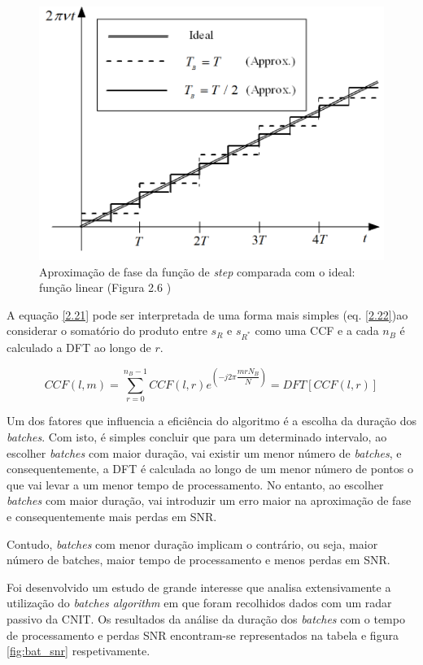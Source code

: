 \begin{figure}[h]
\centering
\includegraphics[scale=0.6]{chapters/ch2/assets/phase_ap}
\caption[Aproximação de fase]{Aproximação de fase da função de \textit{step} comparada com o ideal: função linear (Figura 2.6 \cite{Martorella})}
\label{fig:phase_ap}
\end{figure}

A equação \ref{2.21} pode ser interpretada de uma forma mais simples (eq. \ref{2.22})ao considerar o somatório do produto entre $s_{R}$ e $s_{R^{\ast}}$ como uma \gls{CCF} e a cada $n_{B}$ é calculado a \gls{DFT} ao longo de $r$.

\begin{equation} \label{2.22}
CCF\left( l,m\right)=\sum_{r=0}^{n_{B}-1}CCF\left( l,r\right) e^{\left( -j2\pi \dfrac{mrN_{B}}{N}\right)}=DFT\left[ CCF\left( l,r\right) \right] 
\end{equation}

Um dos fatores que influencia a eficiência do algoritmo é a escolha da duração dos \textit{batches}. Com isto, é simples concluir que para um determinado intervalo, ao escolher \textit{batches} com maior duração, vai existir um menor número de \textit{batches}, e consequentemente, a \gls{DFT} é calculada ao longo de um menor número de pontos o que vai levar a um menor tempo de processamento. No entanto, ao escolher \textit{batches} com maior duração, vai introduzir um erro maior na aproximação de fase e consequentemente mais perdas em \gls{SNR}.\par
Contudo, \textit{batches} com menor duração implicam o contrário, ou seja, maior número de batches, maior tempo de processamento e menos perdas em \gls{SNR}. \par 
Foi desenvolvido um estudo de grande interesse \parencite{Petri2012} que analisa extensivamente a utilização do \textit{batches algorithm} em que foram recolhidos dados com um radar passivo da \gls{CNIT}. Os resultados da análise da duração dos \textit{batches} com o tempo de processamento e perdas \gls{SNR} encontram-se representados na tabela e figura \ref{fig:bat_snr} respetivamente.\par 

